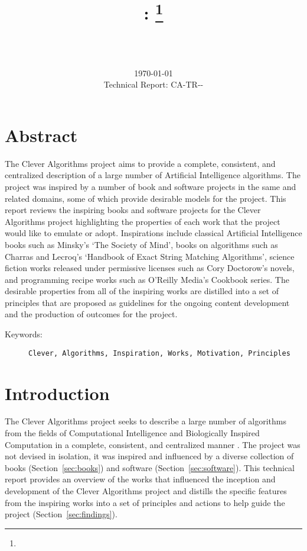 \documentclass[a4paper, 11pt]{article}
\title{{\myreporttitle}: {\myreportsubtitle}\footnote{\myreportlicense}}
\author{\myreportauthor\\{\myreportemail}\\\small\myreportproject}
\date{\today\\{\small{Technical Report: CA-TR-{\myreportdate}-\myreportversion}}}
\begin{document}
\maketitle

\section*{Abstract} 
The Clever Algorithms project aims to provide a complete, consistent, and centralized description of a large number of Artificial Intelligence algorithms.
The project was inspired by a number of book and software projects in the same and related domains, some of which provide desirable models for the project. This report reviews the inspiring books and software projects for the Clever Algorithms project highlighting the properties of each work that the project would like to emulate or adopt.
Inspirations include classical Artificial Intelligence books such as Minsky's `The Society of Mind', books on algorithms such as Charras and Lecroq's `Handbook of Exact String Matching Algorithms', science fiction works released under permissive licenses such as Cory Doctorow's novels, and programming recipe works such as O'Reilly Media's Cookbook series. 
The desirable properties from all of the inspiring works are distilled into a set of principles that are proposed as guidelines for the ongoing content development and the production of outcomes for the project.

\begin{description}
	\item[Keywords:] {\small\texttt{Clever, Algorithms, Inspiration, Works, Motivation, Principles}}
\end{description} 

\section{Introduction}
\label{sec:introduction}
The Clever Algorithms project seeks to describe a large number of algorithms from the fields of Computational Intelligence and Biologically Inspired Computation in a complete, consistent, and centralized manner \cite{Brownlee2010}. The project was not devised in isolation, it was inspired and influenced by a diverse collection of books (Section~\ref{sec:books}) and software (Section~\ref{sec:software}). This technical report provides an overview of the works that influenced the inception and development of the Clever Algorithms project and distills the specific features from the inspiring works into a set of principles and actions to help guide the project (Section~\ref{sec:findings}).
\end{document}
